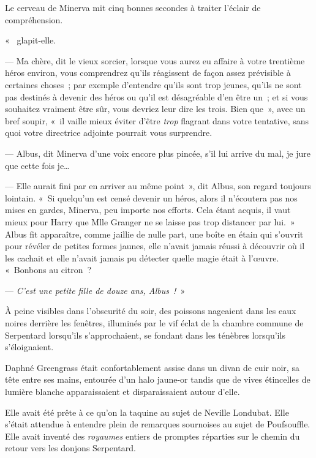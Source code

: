 Le cerveau de Minerva mit cinq bonnes secondes à traiter l'éclair de compréhension.

«~ glapit-elle.

--- Ma chère, dit le vieux sorcier, lorsque vous aurez eu affaire à votre trentième héros environ, vous comprendrez qu'ils réagissent de façon assez prévisible à certaines choses~; par exemple d'entendre qu'ils sont trop jeunes, qu'ils ne sont pas destinés à devenir des héros ou qu'il est désagréable d'en être un~; et si vous souhaitez vraiment être sûr, vous devriez leur dire les trois. Bien que~», avec un bref soupir, «~il vaille mieux éviter d'être \emph{trop} flagrant dans votre tentative, sans quoi votre directrice adjointe pourrait vous surprendre.

--- Albus, dit Minerva d'une voix encore plus pincée, s'il lui arrive du mal, je jure que cette fois je…

--- Elle aurait fini par en arriver au même point~», dit Albus, son regard toujours lointain. «~Si quelqu'un est censé devenir un héros, alors il n'écoutera pas nos mises en gardes, Minerva, peu importe nos efforts. Cela étant acquis, il vaut mieux pour Harry que Mlle Granger ne se laisse pas trop distancer par lui.~» Albus fit apparaître, comme jaillie de nulle part, une boîte en étain qui s'ouvrit pour révéler de petites formes jaunes, elle n'avait jamais réussi à découvrir où il les cachait et elle n'avait jamais pu détecter quelle magie était à l'œuvre. «~Bonbons au citron~?

--- \emph{C'est une petite fille de douze ans, Albus~!}~»


À peine visibles dans l'obscurité du soir, des poissons nageaient dans les eaux noires derrière les fenêtres, illuminés par le vif éclat de la chambre commune de Serpentard lorsqu'ils s'approchaient, se fondant dans les ténèbres lorsqu'ils s'éloignaient.

Daphné Greengrass était confortablement assise dans un divan de cuir noir, sa tête entre ses mains, entourée d'un halo jaune-or tandis que de vives étincelles de lumière blanche apparaissaient et disparaissaient autour d'elle.

Elle avait été prête à ce qu'on la taquine au sujet de Neville Londubat. Elle s'était attendue à entendre plein de remarques sournoises au sujet de Poufsouffle. Elle avait inventé des \emph{royaumes} entiers de promptes réparties sur le chemin du retour vers les donjons Serpentard.

